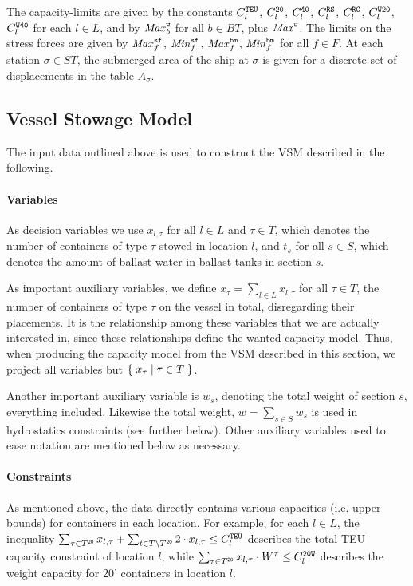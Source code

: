 The capacity-limits are given by the constants $C^{\texttt{TEU}}_l$, $C^{\texttt{20}}_l$, $C^{\texttt{40}}_l$, $C^{\texttt{RS}}_l$, $C^{\texttt{RC}}_l$, $C^{\texttt{W20}}_l$, $C^{\texttt{W40}}_l$ for each $l\in L$, and by $\mathit{Max}^{\texttt{w}}_b$ for all $b\in BT$, plus $\mathit{Max}^{\texttt{w}}$. The limits on the stress forces are given by $\mathit{Max}^{\texttt{sf}}_f$, $\mathit{Min}^{\texttt{sf}}_f$, $\mathit{Max}^{\texttt{bm}}_f$, $\mathit{Min}^{\texttt{bm}}_f$ for all $f\in F$. At each station $\sigma\in ST$, the submerged area of the ship at $\sigma$ is given for a discrete set of displacements in the table $A_\sigma$.

\subsection{Vessel Stowage Model}
The input data outlined above is used to construct the VSM described in the following.

\paragraph{Variables}
As decision variables we use $x_{l,\tau}$ for all $l\in L$ and $\tau \in T$, which denotes the number of containers of type $\tau$ stowed in location $l$, and $t_s$ for all $s\in S$, which denotes the amount of ballast water in ballast tanks in section $s$. 

As important auxiliary variables, we define $x_\tau = \sum_{l\in L} x_{l,\tau}$ for all $\tau\in T$, the number of containers of type $\tau$ on the vessel in total, disregarding their placements. It is the relationship among these variables that we are actually interested in, since these relationships define the wanted capacity model. Thus, when producing the capacity model from the VSM described in this section, we project all variables but $\{\;{x_\tau}\;|\;{\tau \in T}\;\}$.  

Another important auxiliary variable is $w_s$, denoting the total weight of section $s$, everything included. Likewise the total weight, $w = \sum_{s\in S}w_s$ is used in hydrostatics constraints (see further below). 
Other auxiliary variables used to ease notation are mentioned below as necessary.

\paragraph{Constraints}
As mentioned above, the data directly contains various capacities (i.e. upper bounds) for containers in each location. For example, for each $l\in L$, the inequality $\sum_{\tau \in T^{\texttt{20}}}x_{l,\tau} + \sum_{t\in T\setminus T^{\texttt{20}}}2\cdot x_{l,\tau}\leq C^{\texttt{TEU}}_l$  describes the total TEU capacity constraint of location $l$, while $\sum_{\tau \in T^{\texttt{20}}}x_{l,\tau}\cdot W^\tau\leq C^{\texttt{20W}}_l$ describes the weight capacity for 20' containers in location $l$.

